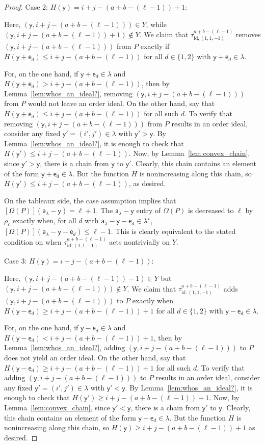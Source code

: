 \documentclass[12pt]{amsart}
\newcommand{\y}{\ensuremath{\mathsf{y}}}
\newcommand{\e}{\ensuremath{\mathsf{e}}}
\newcommand{\aaa}{\ensuremath{\mathsf{a}}}
\theoremstyle{definition}
\theoremstyle{remark}
\numberwithin{equation}{section}
\begin{document}
\begin{proof}
\medskip
\noindent
{\sf Case 2: $H(\y) = i+j-(a+b-(\ell-1))+1$:} 

Here, $(\y,i+j-(a+b-(\ell-1))) \in Y$, while $(\y,i+j-(a+b-(\ell-1))+1) \notin Y$. We claim that $\tau^{a+b-(\ell-1)}_{\text{id},(1,1,-1)}$ removes $(\y,i+j-(a+b-(\ell-1)))$ from $P$ exactly if $H(\y+\e_d) \leq i+j-(a+b-(\ell-1))$ for all $d \in \lbrace 1,2 \rbrace$ with $\y+\e_d \in \lambda$. 

For, on the one hand, if $\y+\e_d \in \lambda$ and $H(\y+\e_d) > i+j-(a+b-(\ell-1))$, then by Lemma~\ref{lem:whos_an_ideal?}, removing $(\y,i+j-(a+b-(\ell-1)))$ from $P$ would not leave an order ideal. 
On the other hand, say that $H(\y+\e_d) \leq i+j-(a+b-(\ell-1))$ for all such $d$. To verify that removing $(\y,i+j-(a+b-(\ell-1)))$ from $P$ results in an order ideal, consider any fixed $\y' = (i',j') \in \lambda$ with $\y' > \y$.  By Lemma~\ref{lem:whos_an_ideal?}, it is enough to check that 
$H(\y') \leq i+j-(a+b-(\ell-1)).$
Now, by Lemma~\ref{lem:convex_chain}, since $\y' > \y$, there is a chain from $\y$ to $\y'$. Clearly, this chain contains an element of the form $\y+\e_{d} \in \lambda$. But the function $H$ is nonincreasing along this chain, so $H(\y') \leq i+j-(a+b-(\ell-1))$, as desired.

On the tableaux side, the case assumption implies that $[\Omega(P)](\aaa_\lambda - \y) = \ell+1$. The $\aaa_\lambda - \y$ entry of $\Omega(P)$ is decreased to $\ell$ by $\rho_\ell$ exactly when, for all $d$ with $\aaa_\lambda - \y -\e_d \in \lambda^\star$, $[\Omega(P)](\aaa_\lambda - \y -\e_d) \leq \ell-1$. This is clearly equivalent to the stated condition on when $\tau^{a+b-(\ell-1)}_{\text{id},(1,1,-1)}$ acts nontrivially on $Y$.

\medskip
\noindent
{\sf Case 3: $H(\y) = i+j-(a+b-(\ell-1))$:}

Here, $(\y,i+j-(a+b-(\ell-1))-1) \in Y$ but $(\y,i+j-(a+b-(\ell-1))) \notin Y$. We claim that $\tau^{a+b-(\ell-1)}_{\text{id},(1,1,-1)}$ adds $(\y,i+j-(a+b-(\ell-1)))$ to $P$ exactly when $H(\y-\e_d) \geq i+j-(a+b-(\ell-1))+1$ for all $d \in \lbrace 1,2 \rbrace$ with $\y-\e_d \in \lambda$. 

For, on the one hand, if $\y-\e_d \in \lambda$ and $H(\y-\e_d) < i+j-(a+b-(\ell-1))+1$, then by Lemma~\ref{lem:whos_an_ideal?}, adding $(\y,i+j-(a+b-(\ell-1)))$ to $P$ does not yield an order ideal. 
On the other hand, say that $H(\y-\e_d) \geq i+j-(a+b-(\ell-1))+1$ for all such $d$. To verify that adding $(\y,i+j-(a+b-(\ell-1)))$ to $P$ results in an order ideal, consider any fixed $\y' = (i',j') \in \lambda$ with $\y' < \y$. By Lemma~\ref{lem:whos_an_ideal?}, it is enough to check that $H(\y') \geq i+j-(a+b-(\ell-1))+1$. 
Now, by Lemma~\ref{lem:convex_chain}, since $\y' < \y$, there is a chain from $\y'$ to $\y$. Clearly, this chain contains an element of the form $\y-\e_d \in \lambda$. But the function $H$ is nonincreasing along this chain, so $H(\y) \geq i+j-(a+b-(\ell-1))+1$ as desired.


\end{proof}
\end{document}
